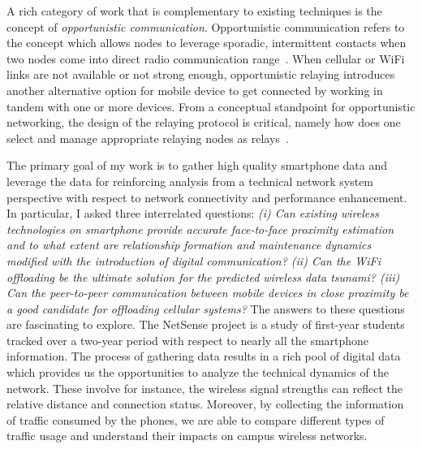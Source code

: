 A rich category of work that is complementary to existing techniques is the concept of \emph{opportunistic communication}. Opportunistic communication refers to the concept which allows nodes to leverage sporadic, intermittent contacts when two nodes come into direct radio communication range~\cite{pelusi2006opportunistic}. When cellular or WiFi links are not available or not strong enough, opportunistic relaying introduces another alternative option for mobile device to get connected by working in tandem with one or more devices.  From a conceptual standpoint for opportunistic networking, the design of the relaying protocol is critical, namely how does one select and manage appropriate relaying nodes as relays~\cite{laneman2004cooperative,sendonaris2003user,bletsas2006simple,lu2009design,bahl2009opportunistic}.  

The primary goal of my work is to gather high quality smartphone data and leverage the data for reinforcing analysis from a technical network system perspective with respect to network connectivity and performance enhancement. In particular, I asked three interrelated questions: \emph{(i) Can existing wireless technologies on smartphone provide accurate face-to-face proximity estimation and to what extent are relationship formation and maintenance dynamics modified with the introduction of digital communication? (ii) Can the WiFi offloading be the ultimate solution for the predicted wireless data tsunami? (iii) Can the peer-to-peer communication between mobile devices in close proximity be a good candidate for offloading cellular systems?} The answers to these questions are fascinating to explore. The NetSense project is a study of first-year students tracked over a two-year period with respect to nearly all the smartphone information. The process of gathering data results in a rich pool of digital data which provides us the opportunities to analyze the technical dynamics of the network. These involve for instance, the wireless signal strengths can reflect the relative distance and connection status. Moreover, by collecting the information of traffic consumed by the phones, we are able to compare different types of traffic usage and understand their impacts on campus wireless networks. 

